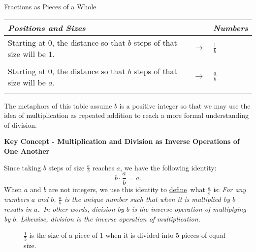 \begin{center}
Fractions as Pieces of a Whole
\begin{tabular}{|p{2in} c p{1.5in}|}
\hline\hline \it{Positions and Sizes} & & \it{Numbers}\\
\hline Starting at $0$, the distance so that $b$ steps of that size will be $1$. & $\longrightarrow$ & $\frac{1}{b}$ \\&&\\
Starting at $0$, the distance so that $b$ steps of that size will be $a$.& $\longrightarrow$ & $\frac{a}{b}$ \\&&\\
\hline
\end{tabular}

\end{center}

The metaphors of this table assume $b$ is a positive integer so that we may use the idea of multiplication as repeated addition to reach a more formal understanding of division. 


\begin{tcolorbox}{\bf Key Concept - Multiplication and Division as Inverse Operations of One Another} 

Since taking $b$ steps of size $\frac{a}{b}$ reaches $a$, we have the following identity:
\[
b\cdot\frac{a}{b} = a.
\]
When $a$ and $b$ are not integers, we use this identity to \underline{define}\ \normalfont what $\frac{a}{b}$ is: \it{For any numbers $a$ and $b$, $\frac{a}{b}$ is the unique number such that when it is multiplied by $b$ results in $a$.\ }\normalfont In other words, \it{division by $b$ is the inverse operation of multiplying by $b$. Likewise, division is the inverse operation of multiplication.}\normalfont 
\end{tcolorbox}

\vspace{.2in}
\begin{figure}[h]
\centering
{}
\caption{$\frac{1}{5}$ is the size of a piece of $1$ when it is divided into $5$ pieces of equal size.}
\label{fig:div1}
\end{figure}   

